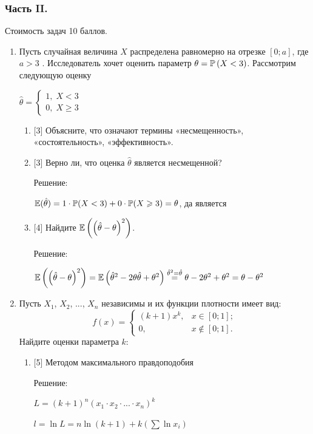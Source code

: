 \documentclass[12pt, a4paper]{article}\usepackage[]{graphicx}\usepackage[]{color}
\begin{document}
\subsubsection*{Часть II.}

Стоимость задач 10 баллов.

\begin{enumerate}
\item Пусть случайная величина  $X$  распределена
равномерно на отрезке $\left[0;a\right]$, где  $a>3$ .
Исследователь хочет оценить параметр  $\theta =\P\left(X<3\right)$. Рассмотрим следующую оценку

$\hat{\theta
}=\left\{\begin{array}{l} {1,\; X<3} \\ {0,\; X\ge 3}
\end{array}\right. $
\begin{enumerate}
\item{} [3] Объясните, что означают термины «несмещенность»,
«состоятельность», «эффективность».
\item{} [3] Верно ли, что оценка $\hat{\theta}$ является несмещенной?

Решение:

$\E(\hat{\theta})=1\cdot \P(X<3)+0\cdot \P(X \ge 3)=\theta$, да
является
\item{} [4] Найдите $\E\left(\left(\hat{\theta }-\theta \right)^{2}
\right)$.

Решение:

$\E\left(\left(\hat{\theta }-\theta \right)^{2} \right)=\E\left(\hat{\theta}^{2}-2\theta\hat{\theta}+\theta^{2}\right) \stackrel{\hat{\theta}^{2}=\hat{\theta}}{=} \theta-2\theta^{2}+\theta^{2}=\theta-\theta^{2}$
\end{enumerate}

\item Пусть $X_{1}$, $X_{2}$, ..., $X_{n}$ независимы и их функции
плотности имеет вид:
\[
f(x)=
\begin{cases}
    (k+1)x^{k}, & x \in [0;1]; \\
    0, & x \notin [0;1].
\end{cases}
\]
Найдите оценки параметра $k$:

\begin{enumerate}
\item{} [5] Методом максимального правдоподобия

Решение:

$L=(k+1)^{n}(x_{1}\cdot x_{2} \cdot...\cdot x_{n})^{k}$

$l=\ln{L}=n\ln(k+1)+k(\sum \ln{x_{i}})$


\end{enumerate}
\end{enumerate}
\end{document}
